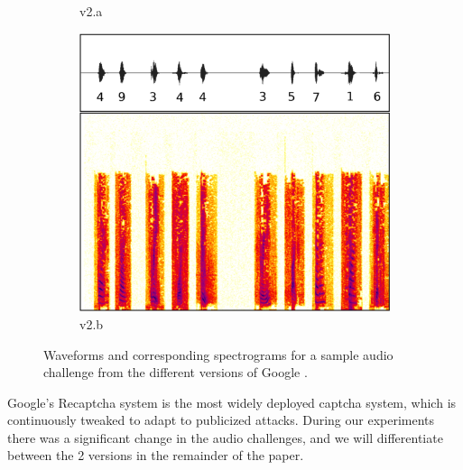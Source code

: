 \begin{figure}[tp]
\begin{subfigure}{0.3\textwidth}
        \caption{\re v2.a}
        \label{fig:recaptcha2a}
\end{subfigure}\hspace{0.03\textwidth}
\begin{subfigure}{0.3\textwidth}
        \includegraphics[width=\textwidth]{figures/recaptcha2a.pdf}
        \caption{\re v2.b}
        \label{fig:recaptcha2b}
\end{subfigure}
\caption{Waveforms and corresponding spectrograms for a sample audio challenge from the different versions of Google \re.}
\label{fig:examples}
\end{figure}

Google's Recaptcha system is the most widely deployed captcha system, which is continuously tweaked to 
adapt to publicized attacks. During our experiments there was a significant change in the audio challenges,
and we will differentiate between the 2 versions in the remainder of the paper. 


